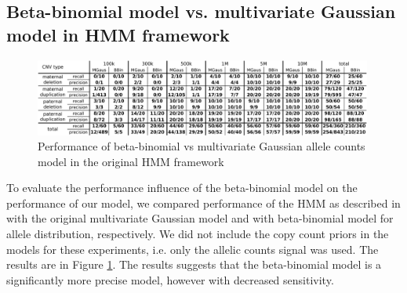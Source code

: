%
%
%

\subsection{Beta-binomial model vs. multivariate Gaussian model in HMM framework}
\begin{figure}
\caption{Performance of beta-binomial vs multivariate Gaussian allele counts model in the original HMM framework}
\label{fig:BBvsMG}
\centering
\includegraphics[width=0.99\textwidth]{figures/hmm_bb_mg}
\end{figure}
To evaluate the performance influence of the beta-binomial model on the performance of our model, we compared performance of the HMM as described in \cite{rampasek2014fcnv} with the original multivariate Gaussian model and with beta-binomial model for allele distribution, respectively. We did not include the copy count priors in the models for these experiments, i.e. only the allelic counts signal was used. The results are in Figure \ref{fig:BBvsMG}. The results suggests that the beta-binomial model is a significantly more precise model, however with decreased sensitivity.


